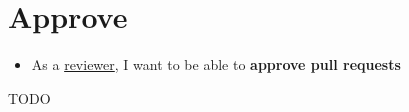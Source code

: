\section{Approve}
\label{sec:ekg-mm-process-approve}

\begin{tcolorbox}[colback=secondary!5,colframe=secondary!80,title=\textbf{User Stories}]
    \begin{itemize}[leftmargin=1em]
        \item As a \underline{reviewer}, I want to be able to \textbf{approve pull requests}
    \end{itemize}
\end{tcolorbox}

TODO
